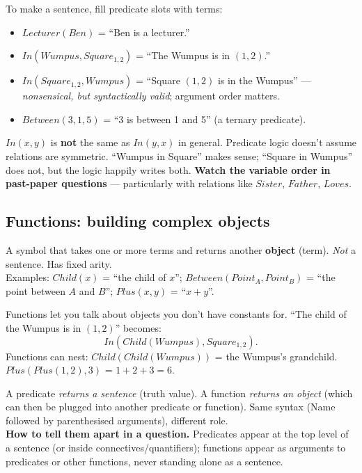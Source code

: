 \documentclass[11pt, a4paper]{article}
\begin{document}
To make a sentence, fill predicate slots with terms:

\begin{itemize}
  \item $Lecturer(Ben)$ = ``Ben is a lecturer.''
  \item $In(Wumpus, Square_{1,2})$ = ``The Wumpus is in $(1,2)$.''
  \item $In(Square_{1,2}, Wumpus)$ = ``Square $(1,2)$ is in the Wumpus'' — \emph{nonsensical, but syntactically valid}; argument order matters.
  \item $Between(3, 1, 5)$ = ``3 is between 1 and 5'' (a ternary predicate).
\end{itemize}

\begin{trapbox}
$In(x, y)$ is \textbf{not} the same as $In(y, x)$ in general. Predicate logic doesn't assume relations are symmetric. ``Wumpus in Square'' makes sense; ``Square in Wumpus'' does not, but the logic happily writes both. \textbf{Watch the variable order in past-paper questions} — particularly with relations like $\mathit{Sister}$, $\mathit{Father}$, $\mathit{Loves}$.
\end{trapbox}

\subsection{Functions: building complex objects}

\begin{defbox}[Function]
A symbol that takes one or more terms and returns another \textbf{object} (term). \emph{Not} a sentence. Has fixed arity.\\[0.3em]
Examples: $Child(x)$ = ``the child of $x$''; $Between(\mathit{Point}_A, \mathit{Point}_B)$ = ``the point between $A$ and $B$''; $Plus(x, y)$ = ``$x + y$''.
\end{defbox}

Functions let you talk about objects you don't have constants for. ``The child of the Wumpus is in $(1,2)$'' becomes:
\[
In(Child(Wumpus), Square_{1,2}).
\]
Functions can nest: $Child(Child(Wumpus))$ = the Wumpus's grandchild. $Plus(Plus(1, 2), 3)$ = $1 + 2 + 3 = 6$.

\begin{notebox}
A predicate \emph{returns a sentence} (truth value). A function \emph{returns an object} (which can then be plugged into another predicate or function). Same syntax (Name followed by parenthesised arguments), different role.\\[0.3em]
\textbf{How to tell them apart in a question.} Predicates appear at the top level of a sentence (or inside connectives/quantifiers); functions appear as arguments to predicates or other functions, never standing alone as a sentence.
\end{notebox}
\end{document}
